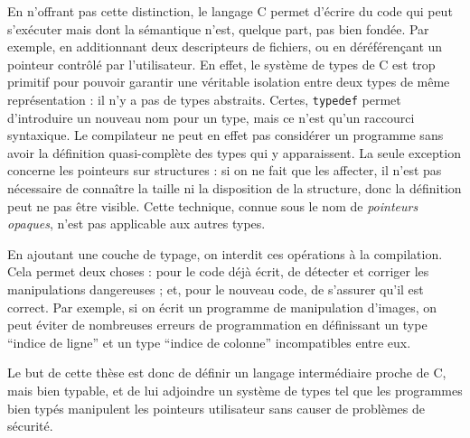 En n'offrant pas cette distinction, le langage C permet d'écrire du code qui
peut s'exécuter mais dont la sémantique n'est, quelque part, pas bien fondée.
Par exemple, en additionnant deux descripteurs de fichiers, ou en déréférençant
un pointeur contrôlé par l'utilisateur. En effet, le système de types de C est
trop primitif pour pouvoir garantir une véritable isolation entre deux types de
même représentation : il n'y a pas de types abstraits. Certes, \texttt{typedef}
permet d'introduire un nouveau nom pour un type, mais ce n'est qu'un raccourci
syntaxique. Le compilateur ne peut en effet pas considérer un programme sans
avoir la définition quasi-complète des types qui y apparaissent. La seule
exception concerne les pointeurs sur structures : si on ne fait que les
affecter, il n'est pas nécessaire de connaître la taille ni la disposition de la
structure, donc la définition peut ne pas être visible. Cette technique, connue
sous le nom de \emph{pointeurs opaques}, n'est pas applicable aux autres types.

En ajoutant une couche de typage, on interdit ces opérations à la compilation.
Cela permet deux choses : pour le code déjà écrit, de détecter et corriger les
manipulations dangereuses ; et, pour le nouveau code, de s'assurer qu'il est
correct. Par exemple, si on écrit un programme de manipulation d'images, on peut
éviter de nombreuses erreurs de programmation en définissant un type
\enquote{indice de ligne} et un type \enquote{indice de colonne} incompatibles
entre eux.


Le but de cette thèse est donc de définir un langage intermédiaire proche de C,
mais bien typable, et de lui adjoindre un système de types tel que les
programmes bien typés manipulent les pointeurs utilisateur sans causer de
problèmes de sécurité.

